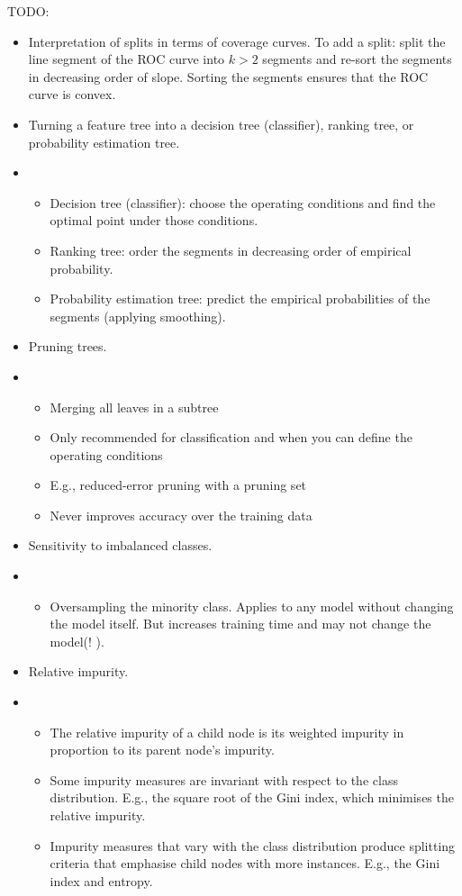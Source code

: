 TODO:

\begin{itemize}
  \item Interpretation of splits in terms of coverage curves.
        To add a split: split the line segment of the ROC curve into $k > 2$ segments
        and re-sort the segments in decreasing order of slope.
        Sorting the segments ensures that the ROC curve is convex.
  \item Turning a feature tree into a decision tree (classifier), ranking tree, or probability estimation tree.
  \item[]
        \begin{itemize}
          \item Decision tree (classifier): choose the operating conditions and find the optimal point under those conditions.
          \item Ranking tree: order the segments in decreasing order of empirical probability.
          \item Probability estimation tree: predict the empirical probabilities of the segments (applying smoothing).
        \end{itemize}
  \item Pruning trees.
  \item[]
        \begin{itemize}
          \item Merging all leaves in a subtree
          \item Only recommended for classification and when you can define the operating conditions
          \item E.g., reduced-error pruning with a pruning set
          \item Never improves accuracy over the training data
        \end{itemize}
  \item Sensitivity to imbalanced classes.
  \item[]
        \begin{itemize}
          \item Oversampling the minority class.
                Applies to any model without changing the model itself.
                But increases training time and may not change the model(!
                ).
        \end{itemize}
  \item Relative impurity.
  \item[]
        \begin{itemize}
          \item The relative impurity of a child node is its weighted impurity in proportion to its parent node's impurity.
          \item Some impurity measures are invariant with respect to the class distribution.
                E.g., the square root of the Gini index, which minimises the relative impurity.
          \item Impurity measures that vary with the class distribution produce splitting criteria that emphasise child nodes with more instances.
                E.g., the Gini index and entropy.
        \end{itemize}
\end{itemize}

